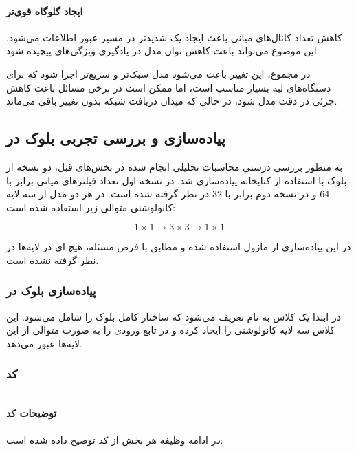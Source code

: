 \documentclass{article}
\begin{document}
\paragraph{ایجاد گلوگاه قوی‌تر}

کاهش تعداد کانال‌های میانی باعث ایجاد یک  شدیدتر در مسیر عبور اطلاعات می‌شود. این موضوع می‌تواند باعث کاهش توان مدل در یادگیری ویژگی‌های پیچیده شود.

در مجموع، این تغییر باعث می‌شود مدل سبک‌تر و سریع‌تر اجرا شود که برای دستگاه‌های لبه بسیار مناسب است، اما ممکن است در برخی مسائل باعث کاهش جزئی در دقت مدل شود، در حالی که میدان دریافت شبکه بدون تغییر باقی می‌ماند.
\subsection{پیاده‌سازی و بررسی تجربی بلوک  در }

به منظور بررسی درستی محاسبات تحلیلی انجام شده در بخش‌های قبل، دو نسخه از بلوک  با استفاده از کتابخانه  پیاده‌سازی شد. در نسخه اول تعداد فیلترهای میانی برابر با \(64\) و در نسخه دوم برابر با \(32\) در نظر گرفته شده است. در هر دو مدل از سه لایه کانولوشنی متوالی زیر استفاده شده است:

\[
1\times1 \rightarrow 3\times3 \rightarrow 1\times1
\]

در این پیاده‌سازی از ماژول  استفاده شده و مطابق با فرض مسئله، هیچ ای در لایه‌ها در نظر گرفته نشده است.

\subsubsection{پیاده‌سازی بلوک در }

در ابتدا یک کلاس به نام  تعریف می‌شود که ساختار کامل بلوک را شامل می‌شود. این کلاس سه لایه کانولوشنی را ایجاد کرده و در تابع  ورودی را به صورت متوالی از این لایه‌ها عبور می‌دهد.
\subsubsection{کد}
\begin{LTR}
	\inputminted{python}{code/ml_hw2_q2.py}
\end{LTR}


\paragraph{توضیحات کد}

در ادامه وظیفه هر بخش از کد توضیح داده شده است:
\end{document}
